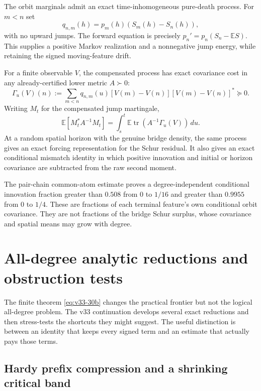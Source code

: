 \documentclass[11pt]{article}
\theoremstyle{definition}
\theoremstyle{remark}
\newcommand{\E}{\mathbb{E}}
\newcommand{\pd}{\succ 0}
\begin{document}
The orbit marginals admit an exact time-inhomogeneous pure-death process. For
$m<n$ set
\begin{equation}
 q_{n,m}(h)=p_m(h)(S_m(h)-S_n(h)),
\end{equation}
with no upward jumps. The forward equation is precisely
$p_n'=p_n(S_n-\E S)$. This supplies a positive Markov realization and a
nonnegative jump energy, while retaining the signed moving-feature drift.

For a finite observable $V$, the compensated process has exact covariance cost
in any already-certified lower metric $A\pd$:
\begin{equation}
 \Gamma_u(V)(n):=\sum_{m<n}q_{n,m}(u)
 [V(m)-V(n)][V(m)-V(n)]^*\succeq0.
\end{equation}
Writing $M_t$ for the compensated jump martingale,
\begin{equation}
 \E[M_t^*A^{-1}M_t]
 =\int_s^t\E\operatorname{tr}(A^{-1}\Gamma_u(V))\,du.
\end{equation}
At a random spatial horizon with the genuine bridge density, the same process
gives an exact forcing representation for the Schur residual. It also gives an
exact conditional mismatch identity in which positive innovation and initial
or horizon covariance are subtracted from the raw second moment.

The pair-chain common-atom estimate proves a degree-independent conditional
innovation fraction greater than $0.508$ from $0$ to $1/16$ and greater than
$0.9955$ from $0$ to $1/4$. These are fractions of each terminal feature's own
conditional orbit covariance. They are not fractions of the bridge Schur
surplus, whose covariance and spatial means may grow with degree.

\section{All-degree analytic reductions and obstruction tests}

The finite theorem \eqref{eq:v33-30b} changes the practical frontier but not
the logical all-degree problem. The v33 continuation develops several exact
reductions and then stress-tests the shortcuts they might suggest. The useful
distinction is between an identity that keeps every signed term and an estimate
that actually pays those terms.

\subsection{Hardy prefix compression and a shrinking critical band}
\end{document}
